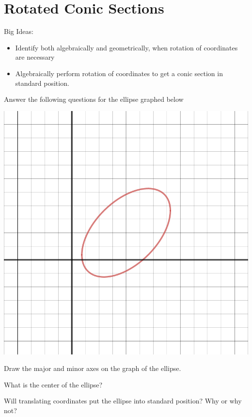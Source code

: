 \section{Rotated Conic Sections}
Big Ideas:
\begin{itemize}
\item Identify both algebraically and geometrically, when rotation of coordinates are necessary
\item Algebraically perform rotation of coordinates to get a conic section in standard position.
\end{itemize}
\bq
Answer the following questions for the ellipse graphed below
\begin{center} \includegraphics[scale=.5]{ellipserot.png} \end{center}
\be
\item Draw the major and minor axes on the graph of the ellipse.
\item What is the center of the ellipse?
\item Will translating coordinates put the ellipse into standard position? Why or why not?
\ee
\eq

